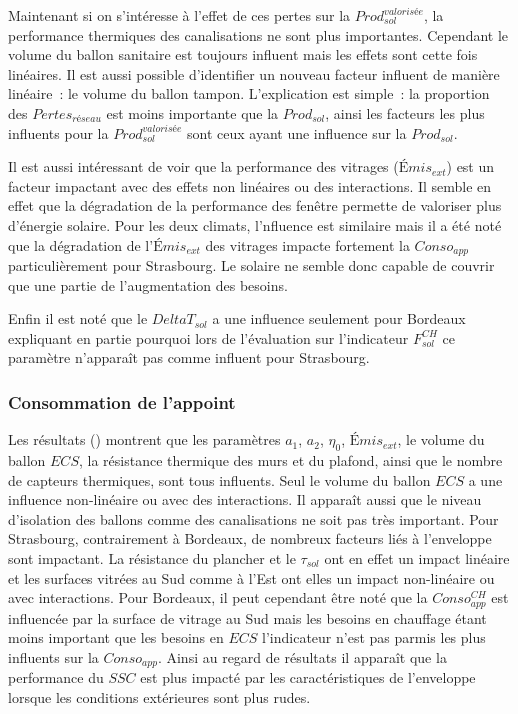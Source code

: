 Maintenant si on s’intéresse à l’effet de ces pertes sur la $Prod_{sol}^{valorisée}$,
la performance thermiques des canalisations ne sont plus importantes. Cependant le volume
du ballon sanitaire est toujours influent mais les effets sont cette fois linéaires. Il est
aussi possible d’identifier un nouveau facteur influent de manière linéaire~: le volume du ballon tampon.
L’explication est simple~: la proportion des $Pertes_{réseau}$ est moins importante que la
$Prod_{sol}$, ainsi les facteurs les plus influents pour la $Prod_{sol}^{valorisée}$ sont ceux
ayant une influence sur la $Prod_{sol}$.

Il est aussi intéressant de voir que la performance des vitrages ($Émis_{ext}$) est un facteur
impactant avec des effets non linéaires ou des interactions. Il semble en effet que la dégradation
de la performance des fenêtre permette de valoriser plus d’énergie solaire. Pour les deux
climats, l’nfluence est similaire mais il a été noté que la dégradation de l’$Émis_{ext}$ des
vitrages impacte fortement la $Conso_{app}$ particulièrement pour Strasbourg. Le solaire
ne semble donc capable de couvrir que une partie de l’augmentation des besoins.

Enfin il est noté que le $DeltaT_{sol}$ a une influence seulement pour Bordeaux expliquant
en partie pourquoi lors de l’évaluation sur l’indicateur $F_{sol}^{CH}$ ce paramètre n’apparaît
pas comme influent pour Strasbourg.

\subsubsection{Consommation de l’appoint} %
\label{ssub:consommation_de_l_appoint}
Les résultats () montrent que les paramètres $a_{1}$,
$a_{2}$, $\eta_{0}$, $Émis_{ext}$, le volume du ballon $ECS$, la résistance thermique des
murs et du plafond, ainsi que le nombre de capteurs thermiques, sont tous influents. Seul
le volume du ballon $ECS$ a une influence non-linéaire ou avec des interactions. Il apparaît aussi que le niveau
d’isolation des ballons comme des canalisations ne soit pas très important.
Pour Strasbourg, contrairement à Bordeaux, de nombreux facteurs liés à l’enveloppe
sont impactant. La résistance du plancher et le $\tau_{sol}$ ont en effet un impact
linéaire et les surfaces vitrées au Sud comme à l’Est ont elles un impact non-linéaire
ou avec interactions.
Pour Bordeaux, il peut cependant être noté que la $Conso_{app}^{CH}$ est influencée par
la surface de vitrage au Sud mais les besoins en chauffage étant moins important que
les besoins en $ECS$ l’indicateur n’est pas parmis les plus influents sur la $Conso_{app}$.
Ainsi au regard de résultats il apparaît que la performance du $SSC$ est plus impacté par
les caractéristiques de l’enveloppe lorsque les conditions extérieures sont plus rudes.


